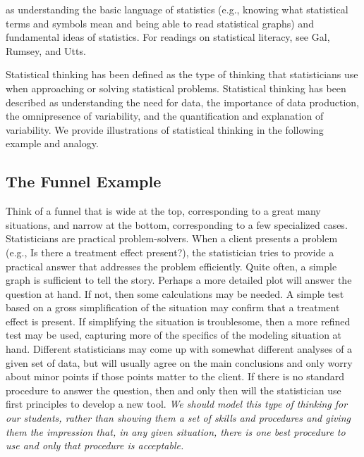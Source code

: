 \documentclass[twoside,openany]{tufte-book}
\begin{document}
 as understanding the basic language of statistics (e.g., knowing what statistical terms and symbols mean and being able to read statistical graphs) and fundamental ideas of statistics. For readings on statistical literacy, see Gal\cite{gal}, Rumsey\cite{rumsey}, and Utts\cite{utts}.
 
Statistical thinking has been defined as the type of thinking that statisticians use when approaching or solving statistical problems. Statistical thinking has been described as understanding the need for data, the importance of data production, the omnipresence of variability, and the quantification and explanation of variability\cite{cobb1}. We provide illustrations of statistical thinking in the following example and analogy.

\subsection{\textbf{The Funnel Example}} 
Think of a funnel that is wide at the top, corresponding to a great many situations, and narrow at the bottom, corresponding to a few specialized cases. Statisticians are practical problem-solvers.  When a client presents a problem (e.g., Is there a treatment effect present?), the statistician tries to provide a practical answer that addresses the problem efficiently. Quite often, a simple graph is sufficient to tell the story. Perhaps a more detailed plot will answer the question at hand. If not, then some calculations may be needed. A simple test based on a gross simplification of the situation may confirm that a treatment effect is present. If simplifying the situation is troublesome, then a more refined test may be used, capturing more of the specifics of the modeling situation at hand.  Different statisticians may come up with somewhat different analyses of a given set of data, but will usually agree on the main conclusions and only worry about minor points if those points matter to the client.  If there is no standard procedure to answer the question, then and only then  will the statistician use first principles to develop a new tool. \textit{We should model this type of thinking for our students, rather than showing them a set of skills and procedures and giving them the impression that, in any given situation, there is one best procedure to use and only that procedure is acceptable.}
 
\end{document}

